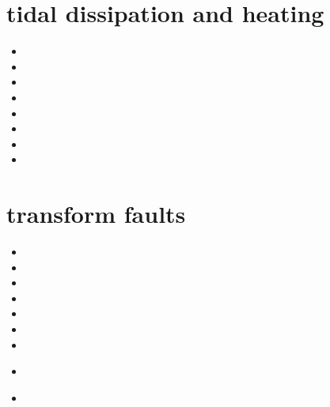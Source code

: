 \section{tidal dissipation and heating} 

\begin{small}
\begin{itemize}
\item[2001]
\item[2005]
\item[2010]
\item[2011]
\item[2012]
\item[2014] 
\item[2018] 
\item[2022]
\end{itemize}
\end{small}

\section{transform faults} 

\begin{small}
\begin{itemize}
\item[\nineteenseventytwo] 
\item[\nineteenseventyeight] 
\item[\twothousandseven] 
\item[\twothousandten] 
\item[\twothousandtwelve] 
\item[\twothousandthirteen] 
\item[\twothousandeighteen] 
\item[\twothousandtwenty] 
 \\
\item[\twothousandtwentytwo] 
\end{itemize}
\end{small}




